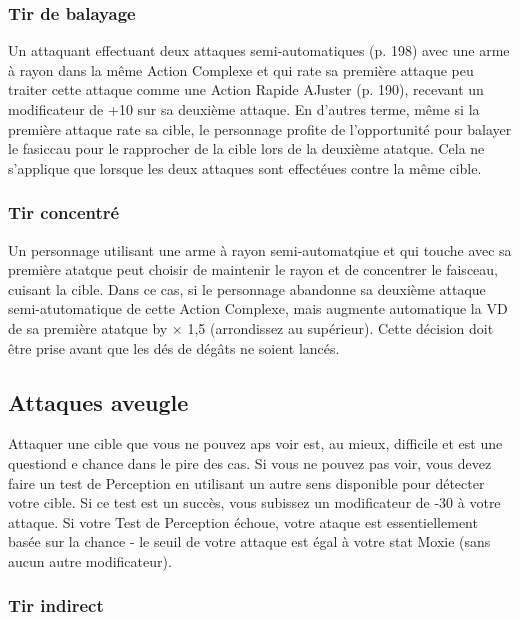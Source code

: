\subsubsection{Tir de balayage} 

Un attaquant effectuant deux attaques semi-automatiques (p. 198) avec une arme à rayon dans la même Action Complexe et qui rate sa première attaque peu traiter cette attaque comme une Action Rapide AJuster (p. 190), recevant un modificateur de +10 sur sa deuxième attaque. En d'autres terme, même si la première attaque rate sa cible, le personnage profite de l'opportunité pour balayer le fasiccau pour le rapprocher de la cible lors de la deuxième atatque. Cela ne s'applique que lorsque les deux attaques sont effectéues contre la même cible. 

\subsubsection{Tir concentré} 

Un personnage utilisant une arme à rayon semi-automatqiue et qui touche avec sa première atatque peut choisir de maintenir le rayon et de concentrer le faisceau, cuisant la cible. Dans ce cas, si le personnage abandonne sa deuxième attaque semi-atutomatique de cette Action Complexe, mais augmente automatique la VD de sa première atatque by $\times$ 1,5 (arrondissez au supérieur). Cette décision doit être prise avant que les dés de dégâts ne soient lancés. 

\subsection{Attaques aveugle} \label{sec:blind-attacks} 

Attaquer une cible que vous ne pouvez aps voir est, au mieux, difficile et est une questiond e chance dans le pire des cas. Si vous ne pouvez pas voir, vous devez faire un test de Perception en utilisant un autre sens disponible pour détecter votre cible. Si ce test est un succès, vous subissez un modificateur de -30 à votre attaque. Si votre Test de Perception échoue, votre ataque est essentiellement basée sur la chance - le seuil de votre attaque est égal à votre stat Moxie (sans aucun autre modificateur). 

\subsubsection{Tir indirect} 

